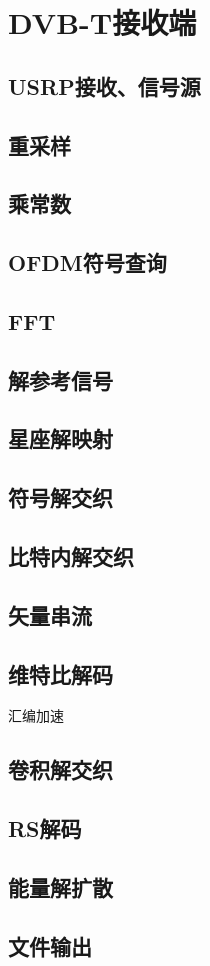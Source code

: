 \chapter{DVB-T接收端}
\section{USRP接收、信号源}
\section{重采样}
\section{乘常数}
\section{OFDM符号查询}
\section{FFT}
\section{解参考信号}
\section{星座解映射}
\section{符号解交织}
\section{比特内解交织}
\section{矢量串流}
\section{维特比解码}
汇编加速
\section{卷积解交织}
\section{RS解码}
\section{能量解扩散}
\section{文件输出}
\endinput